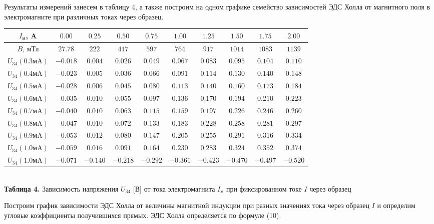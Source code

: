 \documentclass[a4paper,12pt]{article} %
\begin{document}
\hfill \break Результаты измерений занесем в таблицу 4, а также построим на одном графике семейство зависимостей ЭДС Холла от магнитного поля в электромагните при различных токах через образец. 

\begin{center}
\begin{tabular}{|c|c|c|c|c|c|c|c|c|c|}\hline
$I_\text{м}$, A&$0.00$&$0.25$&$0.50$&$0.75$&$1.00$&$1.25$&$1.50$&$1.75$&$2.00$\\\hline
$B$, мТл&$27.78$&$222$&$417$&$597$&$764$&$917$&$1014$&$1083$&$1139$\\\hline
$U_{34}$$(0.3 \text{мA})$&$-0.018$&$0.004$&$0.026$&$0.049$&$0.067$&$0.083$&$0.095$&$0.104$&$0.110$\\\hline
$U_{34}$$(0.4 \text{мA})$&$-0.023$&$0.005$&$0.036$&$0.066$&$0.091$&$0.114$&$0.130$&$0.140$&$0.148$\\\hline
$U_{34}$$(0.5 \text{мA})$&$-0.028$&$0.006$&$0.045$&$0.080$&$0.113$&$0.140$&$0.160$&$0.173$&$0.184$\\\hline
$U_{34}$$(0.6 \text{мA})$&$-0.035$&$0.010$&$0.055$&$0.097$&$0.136$&$0.170$&$0.194$&$0.210$&$0.223$\\\hline
$U_{34}$$(0.7 \text{мA})$&$-0.040$&$0.010$&$0.063$&$0.115$&$0.159$&$0.197$&$0.226$&$0.246$&$0.260$\\\hline
$U_{34}$$(0.8 \text{мA})$&$-0.047$&$0.010$&$0.072$&$0.133$&$0.183$&$0.228$&$0.258$&$0.281$&$0.297$\\\hline
$U_{34}$$(0.9 \text{мA})$&$-0.053$&$0.012$&$0.080$&$0.147$&$0.205$&$0.255$&$0.291$&$0.316$&$0.334$\\\hline
$U_{34}$$(1.0 \text{мA})$&$-0.059$&$0.016$&$0.091$&$0.164$&$0.230$&$0.283$&$0.324$&$0.352$&$0.374$\\\hline
$U_{34}$$(1.0 \text{мA})$&$-0.071$&$-0.140$&$-0.218$&$-0.292$&$-0.361$&$-0.423$&$-0.470$&$-0.497$&$-0.520$\\\hline
\end{tabular}\\
\hfill \break \textbf {Таблица 4.} Зависимость напряжения $U_{34}$ [В] от тока электромагнита $I_\text{м}$ при фиксированном токе $I$ через образец\\
\end{center}

\hfill \break Построим график зависимости ЭДС Холла от величины магнитной индукции при разных значениях тока через образец $I$ и определим угловые коэффициенты получившихся прямых. ЭДС Холла определяется по формуле (10).
\end{document}
